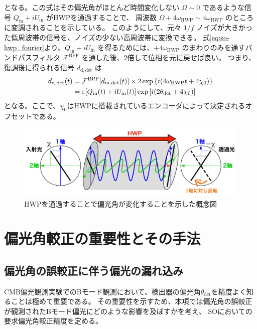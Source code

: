 \documentclass[../../main.tex]{subfiles}
\begin{document}
となる。この式はその偏光角がほとんど時間変化しない $\Omega\sim0$ であるような信号 $Q_{\mathrm{in}}+iU_{\mathrm{in}}$ がHWPを通過することで、
周波数 $\Omega + 4\omega_{\mathrm{HWP}} \sim 4\omega_{\mathrm{HWP}}$ のところに変調されることを示している。
このようにして、元々 $1/f$ ノイズが大きかった低周波帯の信号を、ノイズの少ない高周波帯に変換できる。
式\eqref{eq:so-hwp_fourier}より、$Q_{\mathrm{in}}+iU_{\mathrm{in}}$ を得るためには、$+4\omega_{\mathrm{HWP}}$ のまわりのみを通すバンドパスフィルタ $\mathcal{F}^{\mathrm{BPF}}$ を通した後、2倍して位相を元に戻せば良い。
つまり、復調後に得られる信号 $d_{\mathrm{d, det}}$ は
\begin{align}
    d_{\mathrm{d, det}}(t) &= \mathcal{F}^{\mathrm{BPF}}\qty[d_{\mathrm{m,det}}(t)]\times 2\exp\qty{i\qty(4\omega_{\mathrm{HWP}}t + 4\chi_0)} \\
    &= \varepsilon\qty[Q_{\mathrm{in}}(t) + iU_{\mathrm{in}}(t)]\exp\qty[i\qty(2\theta_{\mathrm{det}}+4\chi_0)]
    \label{eq:so-hwp_demod}
\end{align}
となる。ここで、$\chi_0$はHWPに搭載されているエンコーダによって決定されるオフセットである。

\begin{figure}[H]
    \centering
    \includegraphics[width=1.0\textwidth]{simons_observatory/hwp_satoru.pdf}
    \caption{HWPを通過することで偏光角が変化することを示した概念図~\cite{takakura_PhD}}
    \label{fig:so-hwp_satoru}
\end{figure}

\section{偏光角較正の重要性とその手法}
\subsection{偏光角の誤較正に伴う偏光の漏れ込み}
CMB偏光観測実験でのBモード観測において、検出器の偏光角$\theta_{\mathrm{det}}$を精度よく知ることは極めて重要である。
その重要性を示すため、本項では偏光角の誤較正が観測されたBモード偏光にどのような影響を及ぼすかを考え、
SOにおいての要求偏光角較正精度を定める。
\end{document}
